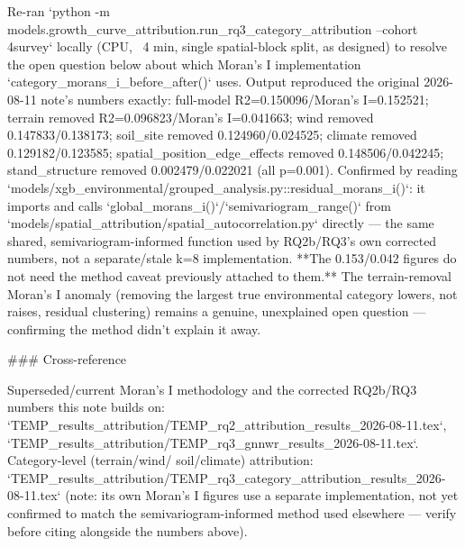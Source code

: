 Re-ran `python -m models.growth_curve_attribution.run_rq3_category_attribution --cohort 4survey`
locally (CPU, ~4 min, single spatial-block split, as designed) to resolve the open question below
about which Moran's I implementation `category_morans_i_before_after()` uses. Output reproduced the
original 2026-08-11 note's numbers exactly: full-model R2=0.150096/Moran's I=0.152521; terrain
removed R2=0.096823/Moran's I=0.041663; wind removed 0.147833/0.138173; soil_site removed
0.124960/0.024525; climate removed 0.129182/0.123585; spatial_position_edge_effects removed
0.148506/0.042245; stand_structure removed 0.002479/0.022021 (all p=0.001). Confirmed by reading
`models/xgb_environmental/grouped_analysis.py::residual_morans_i()`: it imports and calls
`global_morans_i()`/`semivariogram_range()` from `models/spatial_attribution/spatial_autocorrelation.py`
directly — the same shared, semivariogram-informed function used by RQ2b/RQ3's own corrected
numbers, not a separate/stale k=8 implementation. **The 0.153/0.042 figures do not need the method
caveat previously attached to them.** The terrain-removal Moran's I anomaly (removing the
largest true environmental category lowers, not raises, residual clustering) remains a genuine,
unexplained open question — confirming the method didn't explain it away.

### Cross-reference

Superseded/current Moran's I methodology and the corrected RQ2b/RQ3 numbers this note builds on:
`TEMP_results_attribution/TEMP_rq2_attribution_results_2026-08-11.tex`,
`TEMP_results_attribution/TEMP_rq3_gnnwr_results_2026-08-11.tex`. Category-level (terrain/wind/
soil/climate) attribution: `TEMP_results_attribution/TEMP_rq3_category_attribution_results_2026-08-11.tex`
(note: its own Moran's I figures use a separate implementation, not yet confirmed to match the
semivariogram-informed method used elsewhere — verify before citing alongside the numbers above).
